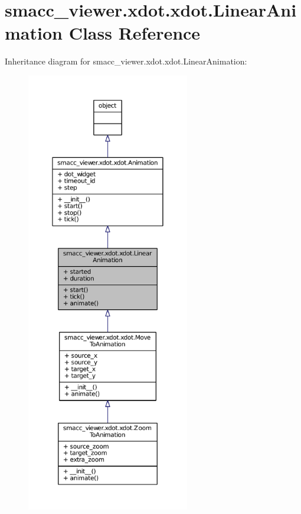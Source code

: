 \hypertarget{classsmacc__viewer_1_1xdot_1_1xdot_1_1LinearAnimation}{}\section{smacc\+\_\+viewer.\+xdot.\+xdot.\+Linear\+Animation Class Reference}
\label{classsmacc__viewer_1_1xdot_1_1xdot_1_1LinearAnimation}


Inheritance diagram for smacc\+\_\+viewer.\+xdot.\+xdot.\+Linear\+Animation\+:
\nopagebreak
\begin{figure}[H]
\begin{center}
\leavevmode
\includegraphics[height=550pt]{classsmacc__viewer_1_1xdot_1_1xdot_1_1LinearAnimation__inherit__graph}
\end{center}
\end{figure}


